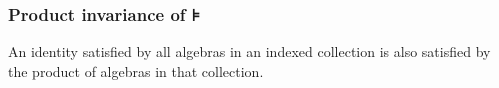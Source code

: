 \subsubsection{Product invariance of ⊧}\label{product-invariance-of}

An identity satisfied by all algebras in an indexed collection is also satisfied by the product of algebras in that collection.
\ccpad
\begin{code}%
\>[0]\AgdaSpace{}%
\AgdaModule{\AgdaUnderscore{}}\AgdaSpace{}%
\AgdaSymbol{\{}\AgdaSpace{}%
\AgdaSpace{}%
\AgdaSpace{}%
\AgdaSymbol{:}\AgdaSpace{}%
\AgdaSymbol{\}\{}\AgdaSpace{}%
\AgdaSymbol{:}\AgdaSpace{}%
\AgdaSpace{}%
\AgdaSymbol{\}}\AgdaSpace{}%
\<%
\\
%
\\[\AgdaEmptyExtraSkip]%
\>[0][@{}l@{\AgdaIndent{0}}]%
\>[1]\AgdaSpace{}%
\AgdaSymbol{:}%
\>[705I]\AgdaSymbol{(}\AgdaSpace{}%
\AgdaSpace{}%
\AgdaSymbol{:}\AgdaSpace{}%
\AgdaSpace{}%
\AgdaSymbol{)(}\AgdaSpace{}%
\AgdaSymbol{:}\AgdaSpace{}%
\AgdaSpace{}%
\AgdaSymbol{)(}\AgdaSpace{}%
\AgdaSymbol{:}\AgdaSpace{}%
\AgdaSpace{}%
\AgdaSpace{}%
\AgdaSpace{}%
\AgdaSpace{}%
\AgdaSymbol{)}\<%
\\
\>[.][@{}l@{}]\<[705I]%
\>[18]\AgdaComment{-------------------------------------------}\<%
\\
\>[1][@{}l@{\AgdaIndent{0}}]%
\>[2]%
\>[18]\AgdaSpace{}%
\AgdaSpace{}%
\AgdaSpace{}%
\AgdaSpace{}%
\AgdaSpace{}%
\AgdaSpace{}%
\AgdaSpace{}%
\AgdaSpace{}%
\AgdaSymbol{)}%
\>[39]%
\>[42]\AgdaSpace{}%
\AgdaSpace{}%
\AgdaSpace{}%
\AgdaSpace{}%
\AgdaSpace{}%
\<%
\\
%
\\[\AgdaEmptyExtraSkip]%
%
\>[1]\AgdaSpace{}%
\AgdaSpace{}%
\AgdaSpace{}%
\AgdaSpace{}%
\AgdaSpace{}%
\AgdaSpace{}%

\end{code}
